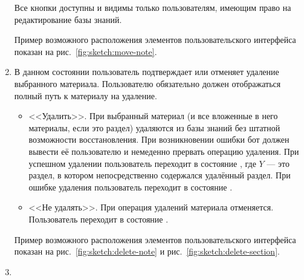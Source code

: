 \begin{enumerate}
                Все кнопки доступны и видимы только пользователям, имеющим право на редактирование базы
                знаний.

                Пример возможного расположения элементов пользовательского интерфейса показан на
                рис.~\ref{fig:sketch:move-note}.


            \item \label{itm:req:ui:states:delete-kbo}

                В данном состоянии пользователь подтверждает или отменяет удаление выбранного
                материала. Пользователю обязательно должен отображаться полный путь к материалу
                на удаление.
                \begin{itemize}
                    \item
                        <<Удалить>>.
                        При  выбранный материал (и все вложенные в него материалы,
                        если это раздел) удаляются из базы знаний без штатной возможности восстановления.
                        При возникновении ошибки бот должен вывести её пользователю и немеденно прервать
                        операцию удаления.
                        При успешном удалении пользователь переходит в состояние
                        \hyperref[itm:req:ui:states:navx]
                        {},
                        где \(Y\) --- это раздел, в котором непосредственно содержался удалённый раздел.
                        При ошибке удаления пользователь переходит в состояние
                        \hyperref[itm:req:ui:states:navx]
                        {}.
                    \item
                        <<Не удалять>>.
                        При  операция удалений материала отменяется.
                        Пользователь переходит в состояние
                        \hyperref[itm:req:ui:states:navx]
                        {}.
                \end{itemize}

                Пример возможного расположения элементов пользовательского интерфейса показан на
                рис.~\ref{fig:sketch:delete-note} и рис.~\ref{fig:sketch:delete-section}.

            \item \label{itm:req:ui:states:create-note}


\end{enumerate}
